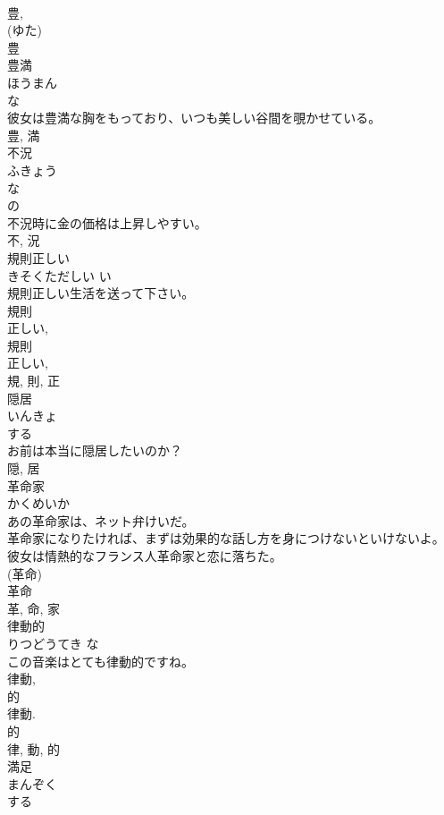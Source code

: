 \documentclass[8pt]{extreport}
\begin{document}
\begin{CJK}{UTF8}{min}
\\	豊, 
\\	(ゆた) 
\\	豊	
\\	豊満	
\\	ほうまん	
\\	な 
\\	彼女は豊満な胸をもっており、いつも美しい谷間を覗かせている。	
\\	豊, 満	
\\	不況	
\\	ふきょう	
\\	な 
\\	の 
\\	不況時に金の価格は上昇しやすい。	
\\	不, 況	
\\	規則正しい	
\\	きそくただしい	い 
\\	規則正しい生活を送って下さい。	
\\	規則 
\\	正しい, 
\\	規則 
\\	正しい, 
\\	規, 則, 正	
\\	隠居	
\\	いんきょ	
\\	する 
\\	お前は本当に隠居したいのか？	
\\	隠, 居	
\\	革命家	
\\	かくめいか	
\\	あの革命家は、ネット弁けいだ。	
\\	革命家になりたければ、まずは効果的な話し方を身につけないといけないよ。	
\\	彼女は情熱的なフランス人革命家と恋に落ちた。	
\\	(革命) 
\\	革命 
\\	革, 命, 家	
\\	律動的	
\\	りつどうてき	な 
\\	この音楽はとても律動的ですね。	
\\	律動, 
\\	的 
\\	律動. 
\\	的 
\\	律, 動, 的	
\\	満足	
\\	まんぞく	
\\	する 

\end{CJK}
\end{document}
